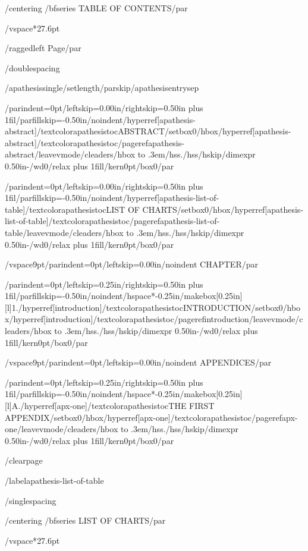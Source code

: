 {/centering
/bfseries TABLE OF CONTENTS/par}

/vspace*{27.6pt}

{/raggedleft
Page/par}

/doublespacing

{/apathesissingle/setlength{/parskip}{/apathesisentrysep}

{/parindent=0pt/leftskip=0.00in/rightskip=0.50in plus 1fil/parfillskip=-0.50in/noindent/hyperref[apathesis-abstract]{/textcolor{apathesistoc}{ABSTRACT}}/setbox0/hbox{/hyperref[apathesis-abstract]{/textcolor{apathesistoc}{/pageref{apathesis-abstract}}}}/leavevmode/cleaders/hbox to .3em{/hss./hss}/hskip/dimexpr 0.50in-/wd0/relax plus 1fill/kern0pt/box0/par}

{/parindent=0pt/leftskip=0.00in/rightskip=0.50in plus 1fil/parfillskip=-0.50in/noindent/hyperref[apathesis-list-of-table]{/textcolor{apathesistoc}{LIST OF CHARTS}}/setbox0/hbox{/hyperref[apathesis-list-of-table]{/textcolor{apathesistoc}{/pageref{apathesis-list-of-table}}}}/leavevmode/cleaders/hbox to .3em{/hss./hss}/hskip/dimexpr 0.50in-/wd0/relax plus 1fill/kern0pt/box0/par}

/vspace{9pt}{/parindent=0pt/leftskip=0.00in/noindent CHAPTER/par}

{/parindent=0pt/leftskip=0.25in/rightskip=0.50in plus 1fil/parfillskip=-0.50in/noindent/hspace*{-0.25in}/makebox[0.25in][l]{1.}/hyperref[introduction]{/textcolor{apathesistoc}{INTRODUCTION}}/setbox0/hbox{/hyperref[introduction]{/textcolor{apathesistoc}{/pageref{introduction}}}}/leavevmode/cleaders/hbox to .3em{/hss./hss}/hskip/dimexpr 0.50in-/wd0/relax plus 1fill/kern0pt/box0/par}

/vspace{9pt}{/parindent=0pt/leftskip=0.00in/noindent APPENDICES/par}

{/parindent=0pt/leftskip=0.25in/rightskip=0.50in plus 1fil/parfillskip=-0.50in/noindent/hspace*{-0.25in}/makebox[0.25in][l]{A.}/hyperref[apx-one]{/textcolor{apathesistoc}{THE FIRST APPENDIX}}/setbox0/hbox{/hyperref[apx-one]{/textcolor{apathesistoc}{/pageref{apx-one}}}}/leavevmode/cleaders/hbox to .3em{/hss./hss}/hskip/dimexpr 0.50in-/wd0/relax plus 1fill/kern0pt/box0/par}

}

/clearpage

/label{apathesis-list-of-table}

/singlespacing

{/centering
/bfseries LIST OF CHARTS/par}

/vspace*{27.6pt}

